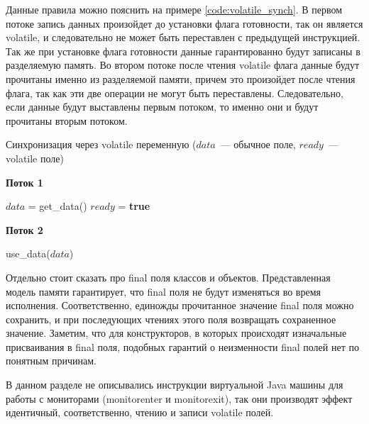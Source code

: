 \documentclass[14pt,titlepage]{extarticle}
\newcommand{\algorithmictitle}[1]{\hspace{8mm}\textbf{#1}}
\newcommand{\BOOLTRUE}{\textbf{true }}
\newcommand{\eng}[1]{{\English#1}}
\begin{document}
      Данные правила можно пояснить на примере \ref{code:volatile_synch}.
      В первом потоке запись данных произойдет до установки флага готовности,
      так он является \eng{volatile}, и следовательно не может быть переставлен
      с предыдущей инструкцией. Так же при установке флага готовности данные
      гарантированно будут записаны в разделяемую память.
      Во втором потоке после чтения \eng{volatile} флага данные будут прочитаны
      именно из разделяемой памяти, причем это произойдет после чтения флага,
      так как эти две операции не могут быть переставлены.
      Следовательно, если данные будут выставлены первым потоком, то именно
      они и будут прочитаны вторым потоком.
      \begin{algorithm}
        \caption{Синхронизация через \eng{volatile} переменную
          ($data$~--- обычное поле, $ready$~--- \eng{volatile} поле)}
        \label{code:volatile_synch}
        \begin{multicols*}{2}
          \algorithmictitle{Поток 1}
          \begin{algorithmic}[1]
            \STATE $data$ = get\_data()
            \STATE $ready$ = \BOOLTRUE
          \end{algorithmic}
          \columnbreak
          \algorithmictitle{Поток 2}
          \begin{algorithmic}[1]
            \STATE {}
            \ENDWHILE
            \STATE use\_data($data$)
          \end{algorithmic}
        \end{multicols*}
      \end{algorithm}

      Отдельно стоит сказать про \eng{final} поля классов и объектов.
      Представленная модель памяти гарантирует, что \eng{final} поля не будут
      изменяться во время исполнения. Соответственно, единожды прочитанное
      значение \eng{final} поля можно сохранить, и при последующих чтениях
      этого поля возвращать сохраненное значение.
      Заметим, что для конструкторов, в которых происходят изначальные
      присваивания в \eng{final} поля, подобных гарантий о неизменности
      \eng{final} полей нет по понятным причинам.

      В данном разделе не описывались инструкции виртуальной Java машины для
      работы с мониторами (\eng{monitorenter} и \eng{monitorexit}), так они
      производят эффект идентичный, соответственно, чтению и записи
      \eng{volatile} полей.
\end{document}
